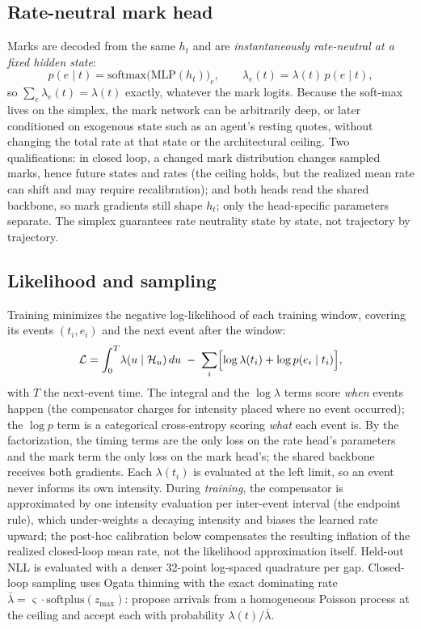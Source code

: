 \subsection{Rate-neutral mark head}
Marks are decoded from the same $h_t$ and are \emph{instantaneously
rate-neutral at a fixed hidden state}:
\[
p(e\mid t)=\mathrm{softmax}\bigl(\mathrm{MLP}(h_t)\bigr)_e,
\qquad
\lambda_e(t)=\lambda(t)\,p(e\mid t),
\]
so $\sum_e\lambda_e(t)=\lambda(t)$ exactly, whatever the mark logits.
Because the soft-max lives on the simplex, the mark network can be
arbitrarily deep, or later conditioned on exogenous state such as an agent's
resting quotes, without changing the total rate at that state or the
architectural ceiling. Two qualifications: in closed loop, a changed mark
distribution changes sampled marks, hence future states and rates (the
ceiling holds, but the realized mean rate can shift and may require
recalibration); and both heads read the shared backbone, so mark gradients
still shape $h_t$; only the head-specific parameters separate. The
simplex guarantees rate neutrality state by state, not trajectory by
trajectory.

\subsection{Likelihood and sampling}
Training minimizes the negative log-likelihood of each training window,
covering its events $(t_i,e_i)$ and the next event after the window:
\[
\mathcal{L}
= \int_{0}^{T}\!\lambda(u\mid\mathcal{H}_u)\,du
\;-\;\sum_{i}\Bigl[\log\lambda(t_i) + \log p(e_i\mid t_i)\Bigr],
\]
with $T$ the next-event time. The integral and the $\log\lambda$ terms score
\emph{when} events happen (the compensator charges for intensity placed where
no event occurred); the $\log p$ term is a categorical cross-entropy scoring
\emph{what} each event is. By the factorization, the timing terms are the
only loss on the rate head's parameters and the mark term the only loss on
the mark head's; the shared backbone receives both gradients. Each
$\lambda(t_i)$ is evaluated at the left limit, so an event never informs its
own intensity. During \emph{training}, the compensator is approximated by
one intensity evaluation per inter-event interval (the endpoint rule), which
under-weights a decaying intensity and biases the learned rate upward; the
post-hoc calibration below compensates the resulting inflation of the
realized closed-loop mean rate, not the likelihood approximation itself.
Held-out NLL is evaluated with a denser 32-point log-spaced quadrature per
gap. Closed-loop sampling uses Ogata thinning with the exact dominating rate
$\bar\lambda=\varsigma\cdot\mathrm{softplus}(z_{\max})$: propose arrivals
from a homogeneous Poisson process at the ceiling and accept each with
probability $\lambda(t)/\bar\lambda$.

